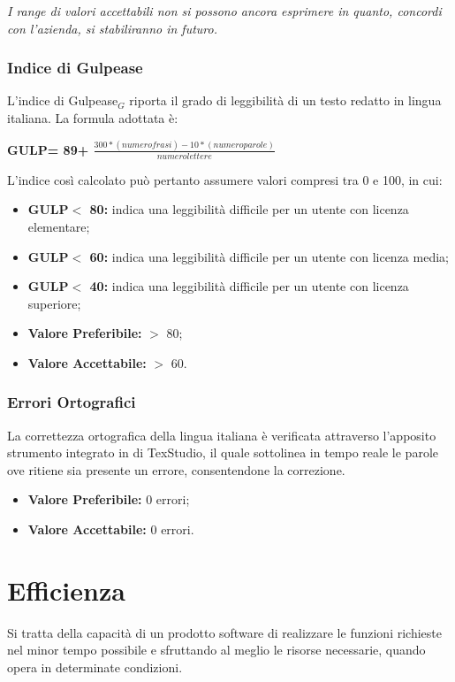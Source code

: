 \textit{I range di valori accettabili non si possono ancora esprimere in quanto, concordi con l'azienda, si stabiliranno in futuro.}
\subsubsection{Indice di Gulpease} \label{QualitàDelProdottoUsabilitàMetricheIndiceDiGulpease}
L’indice di Gulpease$_G$ riporta il grado di leggibilità di un testo redatto in lingua italiana.
La formula adottata è:
\begin{center}
	\textbf{GULP= 89+ $\frac{300*(numero frasi)-10*(numero parole)}{numero lettere}$}
\end{center}
L'indice così calcolato può pertanto assumere valori compresi tra 0 e 100, in cui:
\begin{itemize}
	\item \textbf{GULP$<$ 80:} indica una leggibilità difficile per un utente con licenza elementare;
	\item \textbf{GULP$<$ 60:} indica una leggibilità difficile per un utente con licenza media;
	\item \textbf{GULP$<$ 40:} indica una leggibilità difficile per un utente con licenza superiore;
	\item \textbf{Valore Preferibile:} $>$ 80;
	\item \textbf{Valore  Accettabile:} $>$ 60.
\end{itemize}
\subsubsection{Errori Ortografici} \label{QualitàDelProdottoUsabilitàMetricheErroriOrtografici}
La correttezza ortografica della lingua italiana è verificata attraverso l’apposito strumento integrato in di TexStudio, il quale sottolinea in tempo reale le parole ove ritiene sia presente un errore, consentendone la correzione.
\begin{itemize}
	\item \textbf{Valore Preferibile:} 0 errori;
	\item \textbf{Valore  Accettabile:} 0 errori.
\end{itemize}

\section{Efficienza} \label{QualitàDelProdottoEfficienza}
Si tratta della capacità di un prodotto software di realizzare le funzioni richieste nel minor tempo possibile e sfruttando al meglio le risorse necessarie, quando opera in determinate condizioni. 
